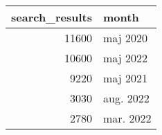 \begin{tabular}{rl}
\toprule
 search\_results &     month \\
\midrule
          11600 &  maj 2020 \\
          10600 &  maj 2022 \\
           9220 &  maj 2021 \\
           3030 & aug. 2022 \\
           2780 & mar. 2022 \\
\bottomrule
\end{tabular}

